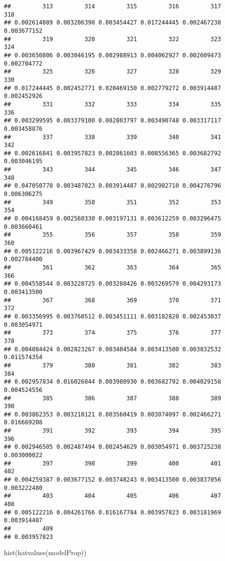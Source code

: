 \documentclass[
]{article}
\newenvironment{Shaded}{\begin{snugshade}}{\end{snugshade}}
\newcommand{\FunctionTok}[1]{\textcolor[rgb]{0.00,0.00,0.00}{#1}}
\newcommand{\NormalTok}[1]{#1}
\begin{document}
\begin{verbatim}
##         313         314         315         316         317         318 
## 0.002614089 0.003206390 0.003454427 0.017244445 0.002467238 0.003677152 
##         319         320         321         322         323         324 
## 0.003650806 0.003046195 0.002988913 0.004062927 0.002609473 0.002704772 
##         325         326         327         328         329         330 
## 0.017244445 0.002452771 0.020469150 0.002779272 0.003914487 0.002452926 
##         331         332         333         334         335         336 
## 0.003299595 0.003379100 0.002803797 0.003490748 0.003317117 0.003458876 
##         337         338         339         340         341         342 
## 0.002616841 0.003957823 0.002861603 0.008556365 0.003682792 0.003046195 
##         343         344         345         346         347         348 
## 0.047050778 0.003487023 0.003914487 0.002982710 0.004276796 0.006306275 
##         349         350         351         352         353         354 
## 0.004168459 0.002560330 0.003197131 0.003612259 0.003296475 0.003660461 
##         355         356         357         358         359         360 
## 0.005122216 0.003967429 0.003433358 0.002466271 0.003899136 0.002784400 
##         361         362         363         364         365         366 
## 0.004558544 0.003228725 0.003288426 0.003269579 0.004293173 0.003413500 
##         367         368         369         370         371         372 
## 0.003356995 0.003760512 0.003451111 0.003182820 0.002453037 0.003054971 
##         373         374         375         376         377         378 
## 0.004084424 0.002823267 0.003404584 0.003413500 0.003832532 0.011574354 
##         379         380         381         382         383         384 
## 0.002957834 0.016026844 0.003980930 0.003682792 0.004029158 0.004524556 
##         385         386         387         388         389         390 
## 0.003862353 0.003210121 0.003560419 0.003074097 0.002466271 0.016669208 
##         391         392         393         394         395         396 
## 0.002946505 0.002487494 0.002454629 0.003054971 0.003725238 0.003000022 
##         397         398         399         400         401         402 
## 0.004259387 0.003677152 0.003748243 0.003413500 0.003837056 0.003222480 
##         403         404         405         406         407         408 
## 0.005122216 0.004261766 0.016167784 0.003957823 0.003181969 0.003914487 
##         409 
## 0.003957823
\end{verbatim}

\begin{Shaded}
\begin{Highlighting}[]
\FunctionTok{hist}\NormalTok{(}\FunctionTok{hatvalues}\NormalTok{(modelProp))}
\end{Highlighting}
\end{Shaded}
\end{document}
